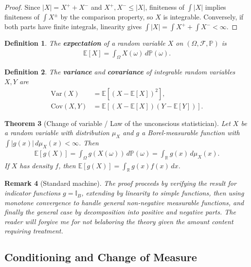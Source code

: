 \documentclass{report}
\theoremstyle{spacedplain}
\newtheorem{theorem}{Theorem}[section]
\theoremstyle{spaceddefinition}
\newtheorem{definition}[theorem]{Definition}
\theoremstyle{spacedremark}
\newtheorem{remark}[theorem]{Remark}
\begin{document}
\begin{proof}
Since $|X| = X^+ + X^-$ and $X^+, X^- \leq |X|$, finiteness of $\int|X|$ implies finiteness of $\int X^\pm$ by the comparison property, so $X$ is integrable. Conversely, if both parts have finite integrals, linearity gives $\int|X| = \int X^+ + \int X^- < \infty$.
\end{proof}

\begin{definition}
The \textbf{expectation} of a random variable $X$ on $(\Omega, \mathcal{F}, \mathbb{P})$ is
\begin{align}
    \mathbb{E}[X] = \int_\Omega X(\omega)\, d\mathbb{P}(\omega).
\end{align}
\end{definition}

\begin{definition}
The \textbf{variance} and \textbf{covariance} of integrable random variables $X, Y$ are
\begin{align}
    \text{Var}(X) &= \mathbb{E}[(X - \mathbb{E}[X])^2], \\
    \text{Cov}(X,Y) &= \mathbb{E}[(X - \mathbb{E}[X])(Y - \mathbb{E}[Y])].
\end{align}
\end{definition}

\begin{theorem}[Change of variable / Law of the unconscious statistician]
Let $X$ be a random variable with distribution $\mu_X$ and $g$ a Borel-measurable function with $\int |g(x)|\, d\mu_X(x) < \infty$. Then
\begin{align}
    \mathbb{E}[g(X)] = \int_\Omega g(X(\omega))\, d\mathbb{P}(\omega) = \int_{\mathbb{R}} g(x)\, d\mu_X(x).
\end{align}
If $X$ has density $f$, then $\mathbb{E}[g(X)] = \int_{\mathbb{R}} g(x) f(x)\, dx$.
\end{theorem}

\begin{remark}[Standard machine]
The proof proceeds by verifying the result for indicator functions $g = \mathbb{I}_B$, extending by linearity to simple functions, then using monotone convergence to handle general non-negative measurable functions, and finally the general case by decomposition into positive and negative parts. The reader will forgive me for not belaboring the theory given the amount content requiring treatment.
\end{remark}


\subsection{Conditioning and Change of Measure}
\end{document}
